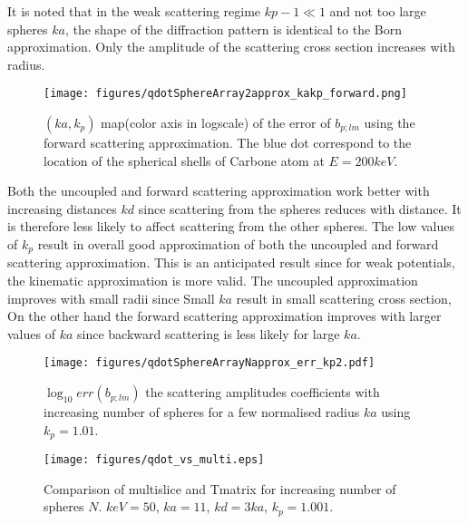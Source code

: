 It is noted that in the weak scattering regime $kp-1\ll 1$ and not too large spheres $ka$, the shape of the diffraction pattern is identical to the Born approximation. Only the amplitude of the scattering cross section increases with radius.

\begin{figure}
  \centering
    \texttt{[image: figures/qdotSphereArray2approx\_kakp\_forward.png]}
  \caption{$(ka,k_p)$ map(color axis in logscale) of the error of $b_{p;lm}$
using the forward scattering approximation.
The blue dot correspond to the location of the spherical shells of Carbone
atom at $E=200keV$.}\label{fig:TmatrixApproxForward}
\end{figure}


Both the uncoupled and forward scattering approximation work better with increasing distances $kd$ since scattering from the spheres reduces with distance. It is therefore less likely to affect scattering from the other spheres.
The low values of $k_p$ result in overall good approximation of both the uncoupled and forward scattering approximation. This is an anticipated result since for weak potentials, the kinematic approximation is more valid.
The uncoupled approximation improves with small radii since Small $ka$ result in small scattering cross section,
On the other hand the forward scattering approximation improves with larger values of $ka$ since backward scattering is less likely for large $ka$.

\begin{figure}
  \centering
    \texttt{[image: figures/qdotSphereArrayNapprox\_err\_kp2.pdf]}
  \caption{$\log_{10}err(b_{p;lm})$ the scattering amplitudes coefficients
  with increasing number of spheres for a few normalised radius $ka$
  using $k_p=1.01$.
}\label{fig:TmatrixApproxErr}
\end{figure}


\begin{figure}
  \centering
    \texttt{[image: figures/qdot\_vs\_multi.eps]}
  \caption{Comparison of multislice and Tmatrix for increasing number of
  spheres $N$. $keV=50$, $ka=11$, $kd=3ka$, $k_p=1.001$.
}\label{fig:MSvsTmatrix}
\end{figure}





